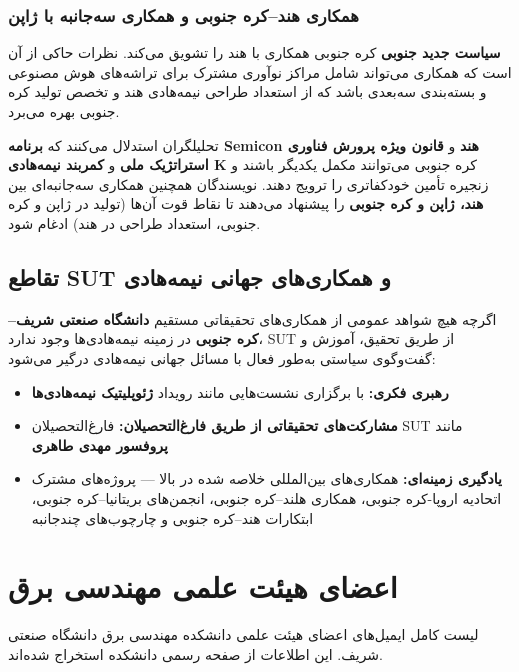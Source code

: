 \documentclass[10pt]{report}
\begin{document}
\subsection{همکاری هند–کره جنوبی و همکاری سه‌جانبه با ژاپن}

\textbf{سیاست جدید جنوبی} کره جنوبی همکاری با هند را تشویق می‌کند. نظرات حاکی از آن است که همکاری می‌تواند شامل مراکز نوآوری مشترک برای تراشه‌های هوش مصنوعی و بسته‌بندی سه‌بعدی باشد که از استعداد طراحی نیمه‌هادی هند و تخصص تولید کره جنوبی بهره می‌برد.

تحلیلگران استدلال می‌کنند که \textbf{برنامه Semicon هند} و \textbf{قانون ویژه پرورش فناوری استراتژیک ملی} و \textbf{کمربند نیمه‌هادی K} کره جنوبی می‌توانند مکمل یکدیگر باشند و زنجیره تأمین خودکفاتری را ترویج دهند. نویسندگان همچنین همکاری سه‌جانبه‌ای بین \textbf{هند، ژاپن و کره جنوبی} را پیشنهاد می‌دهند تا نقاط قوت آن‌ها (تولید در ژاپن و کره جنوبی، استعداد طراحی در هند) ادغام شود.

\section{تقاطع SUT و همکاری‌های جهانی نیمه‌هادی}

اگرچه هیچ شواهد عمومی از همکاری‌های تحقیقاتی مستقیم \textbf{دانشگاه صنعتی شریف–کره جنوبی} در زمینه نیمه‌هادی‌ها وجود ندارد، SUT از طریق تحقیق، آموزش و گفت‌وگوی سیاستی به‌طور فعال با مسائل جهانی نیمه‌هادی درگیر می‌شود:

\begin{itemize}[rightmargin=1.5cm]
\item \textbf{رهبری فکری:} با برگزاری نشست‌هایی مانند رویداد \textbf{ژئوپلیتیک نیمه‌هادی‌ها}
\item \textbf{مشارکت‌های تحقیقاتی از طریق فارغ‌التحصیلان:} فارغ‌التحصیلان SUT مانند \textbf{پروفسور مهدی طاهری}
\item \textbf{یادگیری زمینه‌ای:} همکاری‌های بین‌المللی خلاصه شده در بالا — پروژه‌های مشترک اتحادیه اروپا-کره جنوبی، همکاری هلند–کره جنوبی، انجمن‌های بریتانیا–کره جنوبی، ابتکارات هند–کره جنوبی و چارچوب‌های چندجانبه
\end{itemize}

\clearpage
\chapter{اعضای هیئت علمی مهندسی برق}

\begin{keyconceptbox}
لیست کامل ایمیل‌های اعضای هیئت علمی دانشکده مهندسی برق دانشگاه صنعتی شریف. این اطلاعات از صفحه رسمی دانشکده استخراج شده‌اند.
\end{keyconceptbox}
\end{document}

